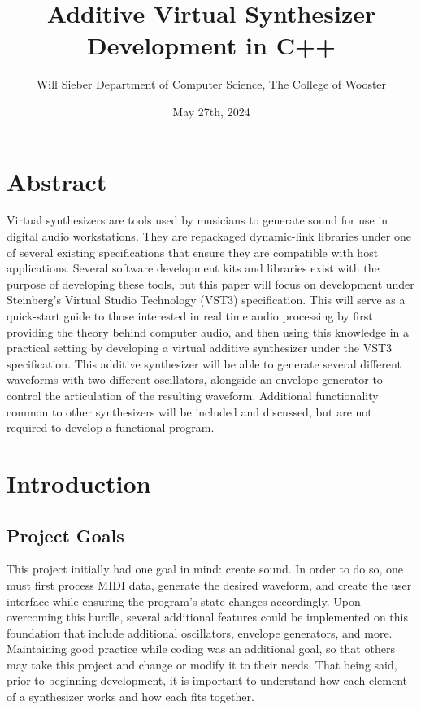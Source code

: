 \documentclass[12pt]{article}
\title{Additive Virtual Synthesizer Development in C++}
\date{May 27th, 2024}
\author{\parbox{\linewidth}{\centering%
	Will Sieber
	\endgraf\bigskip
	Department of Computer Science, The College of Wooster
	\bigskip
}}
\begin{document}
\maketitle

\newpage
\tableofcontents

\section{Abstract}
Virtual synthesizers are tools used by musicians to generate sound for use in digital audio workstations. They are repackaged dynamic-link libraries under one of several existing specifications that ensure they are compatible with host applications. Several software development kits and libraries exist with the purpose of developing these tools, but this paper will focus on development under Steinberg's Virtual Studio Technology (VST3) specification. This will serve as a quick-start guide to those interested in real time audio processing by first providing the theory behind computer audio, and then using this knowledge in a practical setting by developing a virtual additive synthesizer under the VST3 specification. This additive synthesizer will be able to generate several different waveforms with two different oscillators, alongside an envelope generator to control the articulation of the resulting waveform. Additional functionality common to other synthesizers will be included and discussed, but are not required to develop a functional program.
\newpage

\section{Introduction}

\subsection{Project Goals}
This project initially had one goal in mind: create sound. In order to do so, one must first process MIDI data, generate the desired waveform, and create the user interface while ensuring the program's state changes accordingly. Upon overcoming this hurdle, several additional features could be implemented on this foundation that include additional oscillators, envelope generators, and more. Maintaining good practice while coding was an additional goal, so that others may take this project and change or modify it to their needs. That being said, prior to beginning development, it is important to understand how each element of a synthesizer works and how each fits together. 
\end{document}
